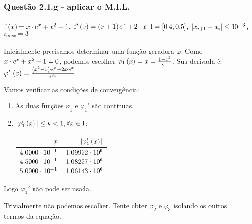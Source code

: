 \begin{frame}
\frametitle{Questão 2.1.g - aplicar o M.I.L. }
\framesubtitle{$\mathrm{f}\left(x\right) = x \cdot e^x + x^2 - 1$,
$\mathrm{f}'\left(x\right) = \left(x + 1\right)e^x + 2 \cdot x$ 
$\mathrm{I} = [0.4,0.5]$, $|x_{i+1} - x_i| \leq 10^{-3}$, $i_{max} = 3$}

{\footnotesize
Inicialmente precisamos determinar uma função geradora $\varphi$. Como $x
\cdot e^x + x^2 - 1 = 0$, podemos escolher 
$\varphi_1\left(x\right) = x = \frac{1 - x^2}{e^x}$. Sua derivada é: 
$\varphi_1'\left(x\right) = 
    \frac{\left(x^2-1\right)\cdot e^x - 2x \cdot e^x}
  {e^{2x}}$

Vamos verificar as condições de convergência:
\begin{enumerate}
  \item As duas funções $\varphi_1$ e $\varphi_1'$ são contínuas.
  \item $|\varphi_1'\left(x\right)| \leq k < 1, \forall x \in \mathrm{I}$:\\
\begin{tabular}{r|r}
$x$ & $|\varphi_1'\left(x\right) |$ \\
\hline
\hline
$4.0000 \cdot 10^{-1}$ & $1.09932 \cdot 10^{0}$ \\
\hline
$4.5000 \cdot 10^{-1}$ & $1.08237 \cdot 10^{0}$ \\
\hline
$5.0000 \cdot 10^{-1}$ & $1.06143 \cdot 10^{0}$ \\
\hline
\end{tabular}
\end{enumerate}

Logo $\varphi_1'$ não pode ser usada. 

Trivialmente não podemos escolher. Tente obter $\varphi_2$ e $\varphi_3$
isolando os outros termos da equação.

}
\end{frame}

